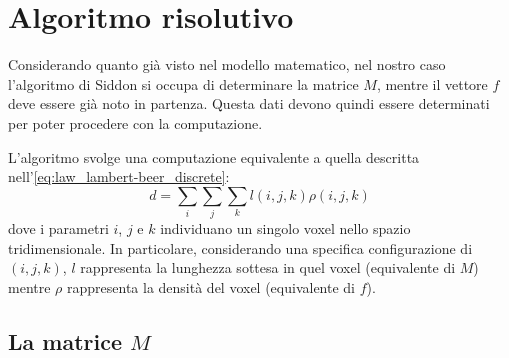 \documentclass[12pt,a4paper]{report}
\begin{document}
\section{Algoritmo risolutivo}

Considerando quanto già visto nel modello matematico, nel nostro caso l'algoritmo di Siddon si occupa di determinare la matrice
\(M\), mentre il vettore \(f\) deve essere già noto in partenza.
Questa dati devono quindi essere determinati per poter procedere con la computazione.

L'algoritmo svolge una computazione equivalente a quella descritta nell'\autoref{eq:law_lambert-beer_discrete}:
\begin{equation*}
  d = \sum_i \sum_j \sum_k l(i, j, k) \rho(i, j, k)
\end{equation*}
dove i parametri \(i\), \(j\) e \(k\) individuano un singolo voxel nello spazio tridimensionale.
In particolare, considerando una specifica configurazione di \((i, j, k)\), \(l\) rappresenta la lunghezza sottesa in quel
voxel (equivalente di \(M\)) mentre \(\rho\) rappresenta la densità del voxel (equivalente di \(f\)).

\subsection{La matrice \(M\)}
\end{document}
